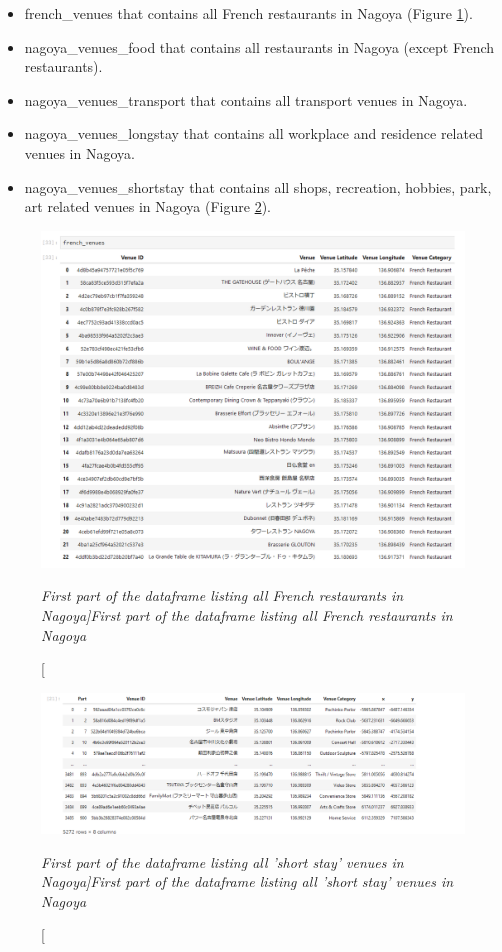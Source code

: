 \documentclass[12pt,a4paper]{article}
\begin{document}
\begin{itemize}
  \item french\_venues that contains all French restaurants in Nagoya (Figure \ref{french_df}).
  \item nagoya\_venues\_food that contains all restaurants in Nagoya (except French restaurants).
  \item nagoya\_venues\_transport that contains all transport venues in Nagoya.
  \item nagoya\_venues\_longstay that contains all workplace and residence related venues in Nagoya.
  \item nagoya\_venues\_shortstay that contains all shops, recreation, hobbies, park, art related venues in Nagoya (Figure \ref{nagoya_shortstay_df}).
\end{itemize}

\begin{figure}[ht]
	\begin{center}
			  \includegraphics[width=15cm]{french_venues_df.png}
	\end{center}
	\caption [\itshape First part of the dataframe listing all French restaurants in Nagoya]{\itshape First part of the dataframe listing all French restaurants in Nagoya}	
	\label{french_df}
\end{figure}

\begin{figure}[ht]
	\begin{center}
			  \includegraphics[width=15cm]{shortstay_venues_df.png}
	\end{center}
	\caption [\itshape First part of the dataframe listing all 'short stay' venues in Nagoya]{\itshape First part of the dataframe listing all 'short stay' venues in Nagoya}	
	\label{nagoya_shortstay_df}
\end{figure}
\end{document}
